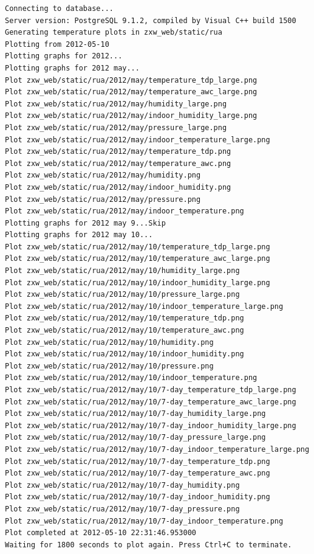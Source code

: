 \documentclass[a4paper,10pt,draft]{book}
\begin{document}
\begin{verbatim}
Connecting to database...
Server version: PostgreSQL 9.1.2, compiled by Visual C++ build 1500
Generating temperature plots in zxw_web/static/rua
Plotting from 2012-05-10
Plotting graphs for 2012...
Plotting graphs for 2012 may...
Plot zxw_web/static/rua/2012/may/temperature_tdp_large.png
Plot zxw_web/static/rua/2012/may/temperature_awc_large.png
Plot zxw_web/static/rua/2012/may/humidity_large.png
Plot zxw_web/static/rua/2012/may/indoor_humidity_large.png
Plot zxw_web/static/rua/2012/may/pressure_large.png
Plot zxw_web/static/rua/2012/may/indoor_temperature_large.png
Plot zxw_web/static/rua/2012/may/temperature_tdp.png
Plot zxw_web/static/rua/2012/may/temperature_awc.png
Plot zxw_web/static/rua/2012/may/humidity.png
Plot zxw_web/static/rua/2012/may/indoor_humidity.png
Plot zxw_web/static/rua/2012/may/pressure.png
Plot zxw_web/static/rua/2012/may/indoor_temperature.png
Plotting graphs for 2012 may 9...Skip
Plotting graphs for 2012 may 10...
Plot zxw_web/static/rua/2012/may/10/temperature_tdp_large.png
Plot zxw_web/static/rua/2012/may/10/temperature_awc_large.png
Plot zxw_web/static/rua/2012/may/10/humidity_large.png
Plot zxw_web/static/rua/2012/may/10/indoor_humidity_large.png
Plot zxw_web/static/rua/2012/may/10/pressure_large.png
Plot zxw_web/static/rua/2012/may/10/indoor_temperature_large.png
Plot zxw_web/static/rua/2012/may/10/temperature_tdp.png
Plot zxw_web/static/rua/2012/may/10/temperature_awc.png
Plot zxw_web/static/rua/2012/may/10/humidity.png
Plot zxw_web/static/rua/2012/may/10/indoor_humidity.png
Plot zxw_web/static/rua/2012/may/10/pressure.png
Plot zxw_web/static/rua/2012/may/10/indoor_temperature.png
Plot zxw_web/static/rua/2012/may/10/7-day_temperature_tdp_large.png
Plot zxw_web/static/rua/2012/may/10/7-day_temperature_awc_large.png
Plot zxw_web/static/rua/2012/may/10/7-day_humidity_large.png
Plot zxw_web/static/rua/2012/may/10/7-day_indoor_humidity_large.png
Plot zxw_web/static/rua/2012/may/10/7-day_pressure_large.png
Plot zxw_web/static/rua/2012/may/10/7-day_indoor_temperature_large.png
Plot zxw_web/static/rua/2012/may/10/7-day_temperature_tdp.png
Plot zxw_web/static/rua/2012/may/10/7-day_temperature_awc.png
Plot zxw_web/static/rua/2012/may/10/7-day_humidity.png
Plot zxw_web/static/rua/2012/may/10/7-day_indoor_humidity.png
Plot zxw_web/static/rua/2012/may/10/7-day_pressure.png
Plot zxw_web/static/rua/2012/may/10/7-day_indoor_temperature.png
Plot completed at 2012-05-10 22:31:46.953000
Waiting for 1800 seconds to plot again. Press Ctrl+C to terminate.
\end{verbatim}
\end{document}
